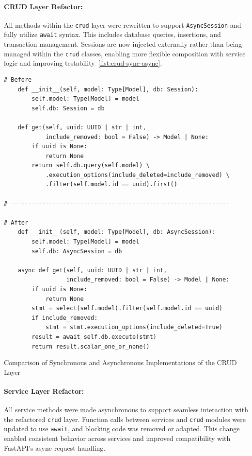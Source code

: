 \paragraph{CRUD Layer Refactor:}
All methods within the \texttt{crud} layer were rewritten to support \texttt{AsyncSession} and fully utilize \texttt{await} syntax. This includes database queries, insertions, and transaction management. Sessions are now injected externally rather than being managed within the \texttt{crud} classes, enabling more flexible composition with service logic and improving testability~\ref{list:crud-sync-async}.

\begin{listing}
  \begin{verbatim}
# Before
    def __init__(self, model: Type[Model], db: Session):
        self.model: Type[Model] = model
        self.db: Session = db

    def get(self, uuid: UUID | str | int,
            include_removed: bool = False) -> Model | None:
        if uuid is None:
            return None
        return self.db.query(self.model) \
            .execution_options(include_deleted=include_removed) \
            .filter(self.model.id == uuid).first()

# ---------------------------------------------------------------

# After
    def __init__(self, model: Type[Model], db: AsyncSession):
        self.model: Type[Model] = model
        self.db: AsyncSession = db

    async def get(self, uuid: UUID | str | int,
                  include_removed: bool = False) -> Model | None:
        if uuid is None:
            return None
        stmt = select(self.model).filter(self.model.id == uuid)
        if include_removed:
            stmt = stmt.execution_options(include_deleted=True)
        result = await self.db.execute(stmt)
        return result.scalar_one_or_none()
\end{verbatim}
\caption{Comparison of Synchronous and Asynchronous Implementations of the CRUD Layer}
\label{list:crud-sync-async}
\end{listing}

\paragraph{Service Layer Refactor:}
All service methods were made asynchronous to support seamless interaction with the refactored \texttt{crud} layer. Function calls between services and \texttt{crud} modules were updated to use \texttt{await}, and blocking code was removed or adapted. This change enabled consistent behavior across services and improved compatibility with FastAPI’s async request handling.

